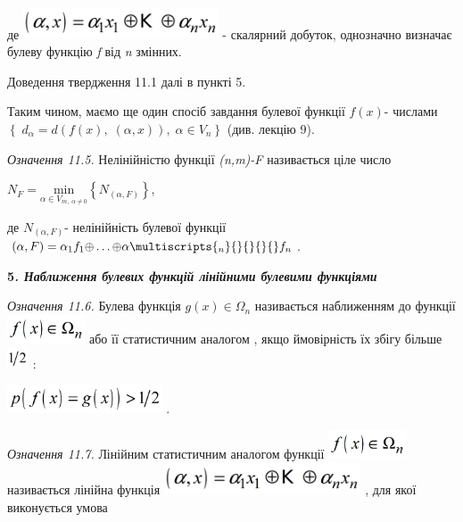 де  
\includegraphics[width=2.2783in,height=0.3709in]{crypt-img/crypt-img267.png}  -
скалярний добуток, однозначно визначає булеву функцію \textit{f  }від\textit{
}\textit{n}\textit{ }змінних. 

Доведення  твердження 11.1 далі в пункті 5.

Таким чином, маємо ще один спосіб завдання булевої функції  $f(x)${}-  числами
  $\left\{ \;d_{\alpha }=d(f(x),\;(\alpha ,x)),\;\alpha \in V_n \right\}$
(див. лекцію 9).

\textit{Означення 11.5.} Нелінійністю функції 
\textit{(}\textit{n}\textit{,}\textit{m}\textit{)-}\textit{F}\textit{ 
}називається ціле число

{\centering
 ${N_{F}=\underset{\alpha \in V_{{m},\;\alpha \neq
0}}{\text{min}}\left\{ N_{(\alpha ,F)} \right\}}$,
\par}

де  $N_{(\alpha ,F)}$-  нелінійність булевої функції  ${(\alpha ,F)=\alpha
_{1}f_{1}{\oplus}\dots{\oplus}\alpha
\multiscripts{_{n}}{}{}{\text{}}{}f_{n}}$.


\bigskip

{\bfseries
5\textit{. Наближення булевих функцій лінійними булевими функціями}}

\textit{Означення 11.6.}\textit{ } Булева функція  $g(x)\in \Omega _n$
називається\textcolor{red}{ } наближенням до функції 
\includegraphics[width=0.9098in,height=0.3354in]{crypt-img/crypt-img268.png} 
або її статистичним аналогом , якщо ймовірність їх збігу більше 
\includegraphics[width=0.25in,height=0.2362in]{crypt-img/crypt-img269.png} :

{\centering
 \includegraphics[width=1.8083in,height=0.3319in]{crypt-img/crypt-img270.png} .
\par}

\textit{Означення 11.7.}\textit{ } Лінійним статистичним аналогом функції 
\includegraphics[width=0.9098in,height=0.3354in]{crypt-img/crypt-img271.png} 
називається лінійна функція 
\includegraphics[width=2.2984in,height=0.3764in]{crypt-img/crypt-img272.png} ,
для якої виконується умова 

